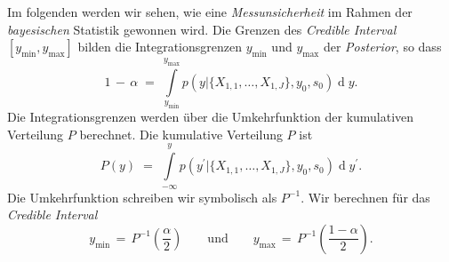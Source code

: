 Im folgenden werden wir sehen, wie eine \textsl{Messunsicherheit} im Rahmen der
\textsl{bayesischen} Statistik gewonnen wird.
Die Grenzen des \textsl{Credible Interval} $[y_\mathrm{min}, y_\mathrm{max}]$ bilden die
Integrationsgrenzen $y_\mathrm{min}$ und $y_\mathrm{max}$ der \textsl{Posterior}, so dass
\begin{equation}
1 \, - \, \alpha \; = \; 
\int\limits_{y_\mathrm{min}}^{y_\mathrm{max}} p(y | \{X_{1,1}, \dots, X_{1,J}\}, y_0, s_0) 
\operatorname{d}y .
\label{UeberdeckungPosterior}
\end{equation}
Die Integrationsgrenzen werden über die Umkehrfunktion der kumulativen Verteilung $P$ berechnet.
Die kumulative Verteilung $P$ ist
\begin{equation}
P(y) \; = \; \int\limits_{-\infty}^{y} p(y^\prime | \{X_{1,1}, \dots, X_{1,J}\}, y_0, s_0) 
\operatorname{d}y^\prime .
\end{equation}
Die Umkehrfunktion schreiben wir symbolisch als $P^{-1}$.
Wir berechnen für das \textsl{Credible Interval}
\begin{equation}
y_\mathrm{min} \, = \, P^{-1}(\frac{\alpha}{2}) \qquad \mathrm{und} \qquad
y_\mathrm{max} \, = \, P^{-1}(\frac{1-\alpha}{2}).
\end{equation}
